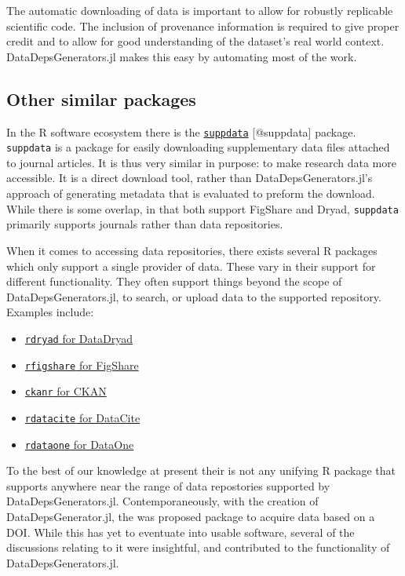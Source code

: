 \documentclass{book}
\begin{document}
The automatic downloading of data is important to allow for robustly
replicable scientific code. The inclusion of provenance information is
required to give proper credit and to allow for good understanding of
the dataset's real world context. DataDepsGenerators.jl makes this easy
by automating most of the work.

\hypertarget{other-similar-packages}{%
	\subsection{Other similar packages}\label{other-similar-packages}}
In the R software ecosystem there is the
\href{https://github.com/ropensci/suppdata}{\texttt{suppdata}}
{[}@suppdata{]} package. \texttt{suppdata} is a package for easily
downloading supplementary data files attached to journal articles. It is
thus very similar in purpose: to make research data more accessible. It
is a direct download tool, rather than DataDepsGenerators.jl's approach
of generating metadata that is evaluated to preform the download. While
there is some overlap, in that both support FigShare and Dryad,
\texttt{suppdata} primarily supports journals rather than data
repositories.

When it comes to accessing data repositories, there exists several R
packages which only support a single provider of data. These vary in
their support for different functionality. They often support things
beyond the scope of DataDepsGenerators.jl, to search, or upload data to
the supported repository. Examples include:

\begin{itemize}
	\item
	\href{https://github.com/ropensci/rdryad}{\texttt{rdryad} for
		DataDryad}
	\item
	\href{https://github.com/ropensci/rfigshare}{\texttt{rfigshare} for
		FigShare}
	\item
	\href{https://github.com/ropensci/ckanr}{\texttt{ckanr} for CKAN}
	\item
	\href{https://github.com/ropensci/rdatacite}{\texttt{rdatacite} for
		DataCite}
	\item
	\href{https://github.com/DataONEorg/rdataone}{\texttt{rdataone} for
		DataOne}
\end{itemize}

To the best of our knowledge at present their is not any unifying R
package that supports anywhere near the range of data repostories
supported by DataDepsGenerators.jl. Contemporaneously, with the creation
of DataDepsGenerator.jl, the was proposed package
 to
acquire data based on a DOI. While this has yet to eventuate into usable
software, several of the discussions relating to it were insightful, and
contributed to the functionality of DataDepsGenerators.jl.
\end{document}
